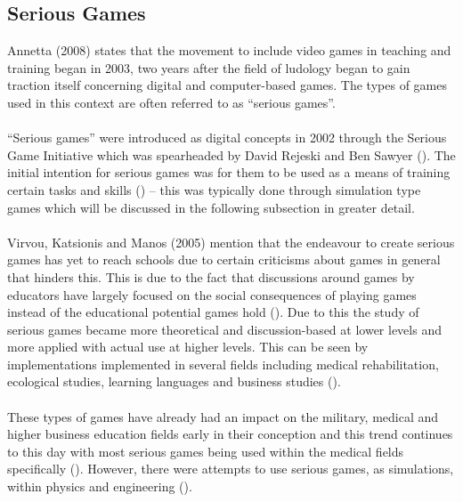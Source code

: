 \subsection{Serious Games}
Annetta (2008) states that the movement to include video games in teaching and training began in 2003, two years after the field of ludology began to gain traction itself concerning digital and computer-based games. The types of games used in this context are often referred to as “serious games”.  
\\\\
“Serious games” were introduced as digital concepts in 2002 through the Serious Game Initiative which was spearheaded by David Rejeski and Ben Sawyer (\cite{DeGloria2014}). The initial intention for serious games was for them to be used as a means of training certain tasks and skills (\cite{DeGloria2014}) – this was typically done through simulation type games which will be discussed in the following subsection in greater detail.
\\\\
Virvou, Katsionis and Manos (2005) mention that the endeavour to create serious games has yet to reach schools due to certain criticisms about games in general that hinders this. This is due to the fact that discussions around games by educators have largely focused on the social consequences of playing games instead of the educational potential games hold (\cite{Squire2003}). Due to this the study of serious games became more theoretical and discussion-based at lower levels and more applied with actual use at higher levels. This can be seen by implementations implemented in several fields including medical rehabilitation, ecological studies, learning languages and business studies (\cite{Burke2009, Costanza2014, Ranalli2008, Tao2009}). 
\\\\
These types of games have already had an impact on the military, medical and higher business education fields early in their conception and this trend continues to this day with most serious games being used within the medical fields specifically (\cite{Annetta2008, DeGloria2014}). However, there were attempts to use serious games, as simulations, within physics and engineering (\cite{Deshpande2011}).

